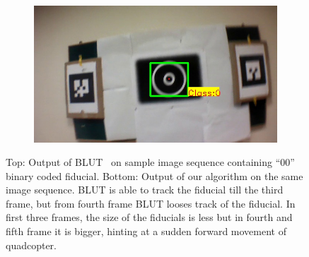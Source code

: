 \documentclass[10pt,twocolumn,letterpaper]{article}
\begin{document}
\begin{figure}
\begin{subfigure}[b]{.19\textwidth}
\end{subfigure}
\begin{subfigure}[b]{.19\textwidth}
\includegraphics[width=\linewidth]{BLUT_input_00/output6.jpg}
\end{subfigure}
\caption{Top: Output of BLUT~\cite{Wu:2011} on sample image sequence containing ``00''
binary coded fiducial. Bottom: Output of our algorithm on the same image
sequence. BLUT is able to track the fiducial till the third frame, but from fourth
frame BLUT looses track of the fiducial. In first three frames, the size of the
fiducials is less but in fourth and fifth frame it is bigger, hinting at a sudden
forward movement of quadcopter.}
\label{fig:BLUT_compare_00}
\end{figure}
\end{document}
